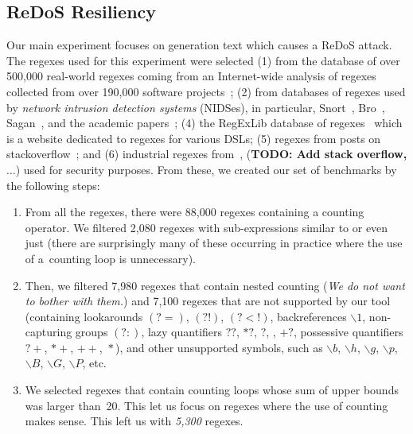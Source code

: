 \documentclass[acmsmall,screen]{acmart}
\begin{document}
\subsection{ReDoS Resiliency}\label{sec:exp_redos}
\vspace{-0.0mm}
Our main experiment focuses on generation text which causes a ReDoS attack.
The regexes used for this experiment were selected (1) from the database of over
500,000 real-world regexes coming
%
from an Internet-wide analysis of regexes collected from over 190,000 software
projects~\cite{DavisMCSL19}; 
(2) from databases of regexes used by \emph{network intrusion detection systems} 
(NIDSes), in particular, Snort~\cite{snort},
Bro~\cite{bro},
Sagan~\cite{sagan}, and the academic
papers~\cite{yang2010,tacas18-appred};
(4) the RegExLib database of regexes~\cite{regexlib} which is a website dedicated to regexes for various DSLs; 
(5) regexes from posts on stackoverflow~\cite{stack}; and
(6) industrial regexes from~\cite{aplas19}, 
(\textbf{TODO: Add stack overflow, $\dots$})
used for security purposes.
From these, we created our set of benchmarks by the following steps:
%
\begin{enumerate}[(1)]
  \item From all the regexes, there were 88,000 regexes containing a counting operator. 
  We filtered 2,080 regexes with sub-expressions similar to  or even just 
  (there are surprisingly many of these occurring in practice where the
    use of a~counting loop is unnecessary).
\cbstart
  \item Then, we filtered 7,980 regexes that contain nested counting (\emph{We do not want to bother with them.})
  and 7,100 regexes that are not supported by our tool (containing lookarounds $(?=)$, $(?!)$, $(?<!)$, backreferences $\backslash 1$, non-capturing groups $(?:)$, lazy quantifiers $??$, $*?$, ${}?$, , $+?$, possessive quantifiers $?+$, $*+$, $++$, ${}*$), and other unsupported symbols, such as $\backslash b$, $\backslash h$, $\backslash g$, $\backslash p$, $\backslash B$, $\backslash G$, $\backslash P$, etc.
\cbstart
  \item  We selected regexes that contain counting loops whose
    sum of upper bounds was larger than~20.
    This let us focus on regexes where the use of counting makes
    sense.
    This left us with \emph{5,300} regexes.
\end{enumerate}
\end{document}
